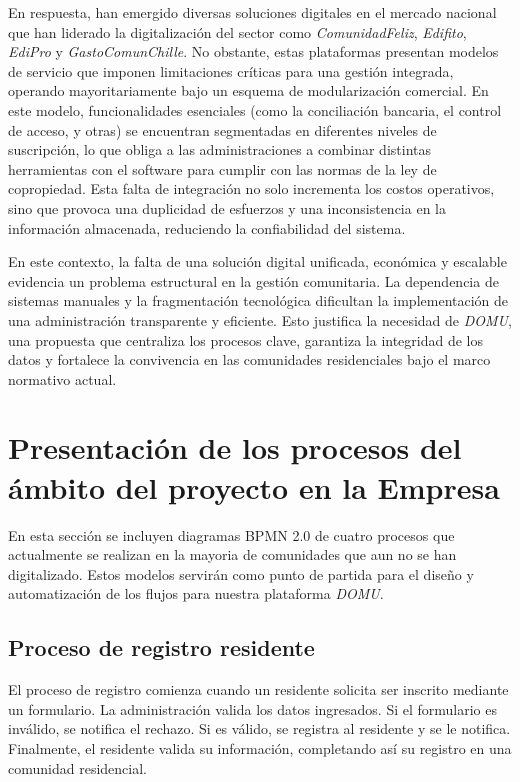 En respuesta, han emergido diversas soluciones digitales en el mercado nacional que han liderado la digitalización del sector como \textit{ComunidadFeliz}, \textit{Edifito}, \textit{EdiPro} y \textit{GastoComunChille}. No obstante, estas plataformas  presentan modelos de servicio que imponen limitaciones críticas para una gestión integrada, operando mayoritariamente bajo un esquema de modularización comercial. En este modelo, funcionalidades esenciales (como la conciliación bancaria, el control de acceso, y otras) se encuentran segmentadas en diferentes niveles de suscripción, lo que obliga a las administraciones a combinar distintas herramientas con el software para cumplir con las normas de la ley de copropiedad. Esta falta de integración no solo incrementa los costos operativos, sino que provoca una duplicidad de esfuerzos y una inconsistencia en la información almacenada, reduciendo la confiabilidad del sistema.

En este contexto, la falta de una solución digital unificada, económica y escalable evidencia un problema estructural en la gestión comunitaria. La dependencia de sistemas manuales y la fragmentación tecnológica dificultan la implementación de una administración transparente y eficiente. Esto justifica la necesidad de \textit{DOMU}, una propuesta que centraliza los procesos clave, garantiza la integridad de los datos y fortalece la convivencia en las comunidades residenciales bajo el marco normativo actual.

\section{Presentación de los procesos del ámbito del proyecto en la Empresa}

En esta sección se incluyen diagramas BPMN 2.0 de cuatro procesos que actualmente se realizan en la mayoria de comunidades que aun no se han digitalizado. Estos modelos servirán como punto de partida para el diseño y automatización de los flujos para nuestra plataforma \textit{DOMU}.

\subsection{Proceso de registro residente}

El proceso de registro comienza cuando un residente solicita ser inscrito mediante un formulario. La administración valida los datos ingresados. Si el formulario es inválido, se notifica el rechazo. Si es válido, se registra al residente y se le notifica. Finalmente, el residente valida su información, completando así su registro en una comunidad residencial.

